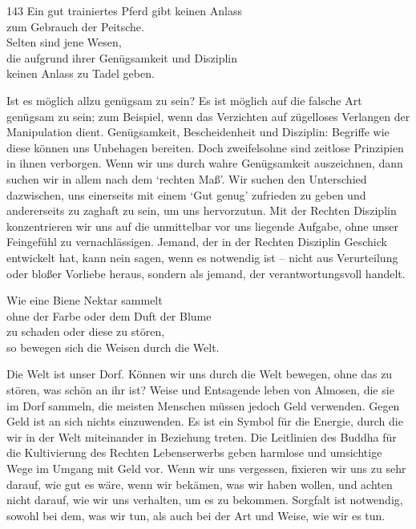 
\begin{dhpVerse}{143}
\label{dhp-143}
Ein gut trainiertes Pferd gibt keinen Anlass\\ 
zum Gebrauch der Peitsche.\\ 
Selten sind jene Wesen,\\ 
die aufgrund ihrer Genügsamkeit und Disziplin\\ 
keinen Anlass zu Tadel geben. 
\end{dhpVerse}

\begin{dhpRefl}

Ist es möglich allzu genügsam zu sein? Es ist möglich auf die falsche Art
genügsam zu sein; zum Beispiel, wenn das Verzichten auf zügelloses Verlangen
der Manipulation dient. Genügsamkeit, Bescheidenheit und Disziplin: Begriffe
wie diese können uns Unbehagen bereiten. Doch zweifelsohne sind zeitlose
Prinzipien in ihnen verborgen. Wenn wir uns durch wahre Genügsamkeit
auszeichnen, dann suchen wir in allem nach dem `rechten Maß'. Wir suchen den
Unterschied dazwischen, uns einerseits mit einem `Gut genug' zufrieden zu
geben und andererseits zu zaghaft zu sein, um uns hervorzutun. Mit der Rechten
Disziplin konzentrieren wir uns auf die unmittelbar vor uns liegende Aufgabe,
ohne unser Feingefühl zu vernachlässigen. Jemand, der in der Rechten Disziplin
Geschick entwickelt hat, kann nein sagen, wenn es notwendig ist -- nicht aus
Verurteilung oder bloßer Vorliebe heraus, sondern als jemand, der
verantwortungsvoll handelt.

\end{dhpRefl}


\begin{dhpVerse}{49}
\label{dhp-49}
Wie eine Biene Nektar sammelt\\ 
ohne der Farbe oder dem Duft der Blume\\ 
zu schaden oder diese zu stören,\\ 
so bewegen sich die Weisen durch die Welt. 
\end{dhpVerse}

\begin{dhpRefl}

Die Welt ist unser Dorf. Können wir uns durch die Welt bewegen, ohne das zu
stören, was schön an ihr ist? Weise und Entsagende leben von Almosen, die sie
im Dorf sammeln, die meisten Menschen müssen jedoch Geld verwenden. Gegen Geld
ist an sich nichts einzuwenden. Es ist ein Symbol für die Energie, durch die
wir in der Welt miteinander in Beziehung treten. Die Leitlinien des Buddha für
die Kultivierung des Rechten Lebenserwerbs geben harmlose und umsichtige Wege
im Umgang mit Geld vor. Wenn wir uns vergessen, fixieren wir uns zu sehr
darauf, wie gut es wäre, wenn wir bekämen, was wir haben wollen, und achten
nicht darauf, wie wir uns verhalten, um es zu bekommen. Sorgfalt ist
notwendig, sowohl bei dem, was wir tun, als auch bei der Art und Weise, wie
wir es tun.

\end{dhpRefl}

